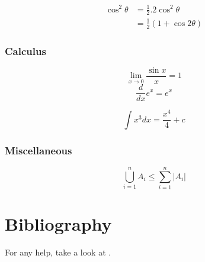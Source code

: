 \documentclass[a4paper, 12pt]{article}
\begin{document}
		
		
		\begin{align*}
			\cos^2\theta & = \frac{1}{2}.2\cos^2\theta\\
			& = \frac{1}{2}(1+\cos2\theta)
		\end{align*}
	
	\subsubsection{Calculus}
		\begin{equation}
			\lim_{x\to 0}	\frac{\sin x}{x} = 1
		\end{equation}
		\begin{equation}
			\frac{d}{dx}e^x = e^x
		\end{equation}
		
		\begin{equation}
			\int x^3 dx = \frac{x^4}{4} + c
		\end{equation}
		
	\subsubsection{Miscellaneous}
		\begin{equation}
			\bigcup\limits_{i=1}^{n} A_i \leq \sum_{i=1}^{n} |A_i|
		\end{equation}
		
	\section{Bibliography}
		For any help, take a look at \cite{source1}.
	
	
	
	
\end{document}
